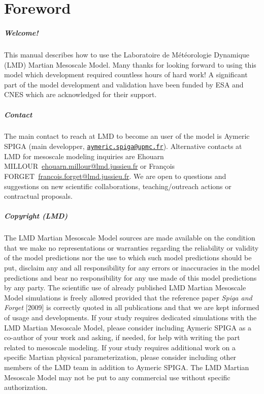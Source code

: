 \chapter*{Foreword}

\vk
\paragraph{Welcome!} This manual describes how to use the Laboratoire de M\'et\'eorologie Dynamique (LMD) Martian Mesoscale Model. Many thanks for looking forward to using this model which development required countless hours of hard work! A significant part of the model development and validation have been funded by ESA and CNES which are acknowledged for their support.

\paragraph{Contact} The main contact to reach at LMD to become an user of the model is Aymeric SPIGA (main developper, \href{mailto:aymeric.spiga@upmc.fr}{\nolinkurl{aymeric.spiga@upmc.fr}}). Alternative contacts at LMD for mesoscale modeling inquiries are Ehouarn MILLOUR~\url{ehouarn.millour@lmd.jussieu.fr} or Fran\c cois FORGET~\url{francois.forget@lmd.jussieu.fr}. We are open to questions and suggestions on new scientific collaborations, teaching/outreach actions or contractual proposals.

\paragraph{Copyright (LMD)} The LMD Martian Mesoscale Model sources are made available on the condition that we make no representations or warranties regarding the reliability or validity of the model predictions nor the use to which such model predictions should be put, disclaim any and all responsibility for any errors or inaccuracies in the model predictions and bear no responsibility for any use made of this model predictions by any party. The scientific use of already published LMD Martian Mesoscale Model simulations is freely allowed provided that the reference paper \textit{Spiga and Forget} [2009]\nocite{Spig:09} is correctly quoted in all publications and that we are kept informed of usage and developments. If your study requires dedicated simulations with the LMD Martian Mesoscale Model, please consider including Aymeric SPIGA as a co-author of your work and asking, if needed, for help with writing the part related to mesoscale modeling. If your study requires additional work on a specific Martian physical parameterization, please consider including other members of the LMD team in addition to Aymeric SPIGA. The LMD Martian Mesoscale Model may not be put to any commercial use without specific authorization. 

